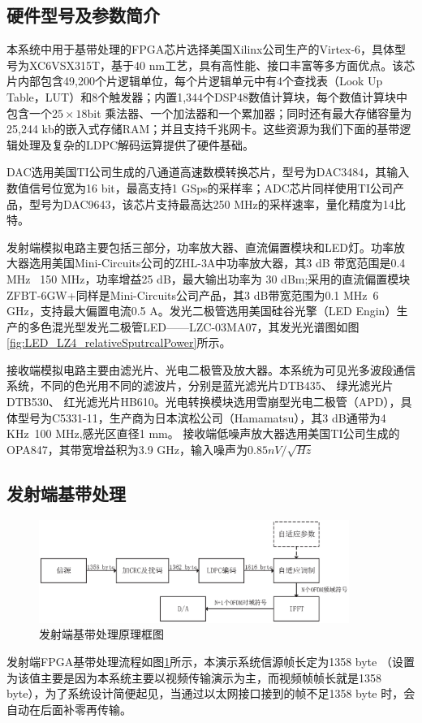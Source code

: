 \subsection{硬件型号及参数简介}
本系统中用于基带处理的FPGA芯片选择美国Xilinx公司生产的Virtex-6，具体型号为XC6VSX315T，基于40 nm工艺，具有高性能、接口丰富等多方面优点。该芯片内部包含49,200个片逻辑单位，每个片逻辑单元中有4个查找表（Look Up Table，LUT）和8个触发器；内置1,344个DSP48数值计算块，每个数值计算块中包含一个$25\times 18$bit 乘法器、一个加法器和一个累加器；同时还有最大存储容量为25,244 kb的嵌入式存储RAM；并且支持千兆网卡\cite{FPGAIntroduciton}。这些资源为我们下面的基带逻辑处理及复杂的LDPC解码运算提供了硬件基础。

DAC选用美国TI公司生成的八通道高速数模转换芯片，型号为DAC3484，其输入数值信号位宽为16 bit，最高支持1 GSps的采样率；ADC芯片同样使用TI公司产品，型号为DAC9643，该芯片支持最高达250 MHz的采样速率，量化精度为14比特。

发射端模拟电路主要包括三部分，功率放大器、直流偏置模块和LED灯。功率放大器选用美国Mini-Circuits公司的ZHL-3A中功率放大器，其3 dB 带宽范围是0.4 MHz ~150 MHz，功率增益25 dB，最大输出功率为 30 dBm;采用的直流偏置模块ZFBT-6GW+同样是Mini-Circuits公司产品，其3 dB带宽范围为0.1 MHz~6 GHz，支持最大偏置电流0.5 A。发光二极管选用美国硅谷光擎（LED Engin）生产的多色混光型发光二极管LED——LZC-03MA07，其发光光谱图如图\ref{fig:LED_LZ4_relativeSputrcalPower}所示。

接收端模拟电路主要由滤光片、光电二极管及放大器。本系统为可见光多波段通信系统，不同的色光用不同的滤波片，分别是蓝光滤光片DTB435、 绿光滤光片DTB530、 红光滤光片HB610。光电转换模块选用雪崩型光电二极管（APD），具体型号为C5331-11，生产商为日本滨松公司（Hamamatsu），其3 dB通带为4 KHz~100 MHz,感光区直径1 mm。 接收端低噪声放大器选用美国TI公司生成的OPA847，其带宽增益积为3.9 GHz，输入噪声为$0.85 nV/\sqrt{Hz}$
\subsection{发射端基带处理}
\begin{figure}[htbp]
\centering
\includegraphics[width=0.9\textwidth]{figures/chapter-5/TransmitterSchematic.eps}
\caption{发射端基带处理原理框图}
\label{fig:TransmitterSchematic}
\end{figure}
发射端FPGA基带处理流程如图\ref{fig:TransmitterSchematic}所示，本演示系统信源帧长定为1358 byte （设置为该值主要是因为本系统主要以视频传输演示为主，而视频帧帧长就是1358 byte），为了系统设计简便起见，当通过以太网接口接到的帧不足1358 byte 时，会自动在后面补零再传输。

